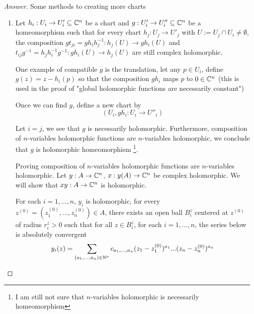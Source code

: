 \documentclass{article}
\begin{document}
\begin{proof}[Answer]
    Some methods to creating more charts
    \begin{enumerate}
        \item Let $h_i: U_i \to U'_i \subseteq \mathbb{C}^n$ be a chart and $g: U'_i \to U''_i \subseteq \mathbb{C}^n$ be a homeomorphism such that for every chart $h_j: U_j \to U'_j$ with $U := U_j \cap U_i \neq \emptyset$, the composition $g t_{ji} = g h_i h^{-1}_j: h_j(U) \to g h_i (U)$ and $t_{ij} g^{-1} = h_j h^{-1}_i g^{-1}: g h_i(U) \to h_j (U)$ are still complex holomorphic.
        \begin{center}
        \end{center}
        One example of compatible $g$ is the translation, let any $p \in U_i$, define $g(z) = z - h_i(p)$ so that the composition $g h_i$ maps $p$ to $0 \in \mathbb{C}^n$ (this is used in the proof of "global holomorphic functions are necessarily constant")

        Once we can find $g$, define a new chart by
        $$
            (U_i, g h_i: U_i \to U''_i)
        $$

        Let $i = j$, we see that $g$ is necessarily holomorphic. Furthermore, composition of $n$-variables holomorphic functions are $n$-variables holomorphic, we conclude that $g$ is holomorphic homeomorphism \footnote{I am still not sure that $n$-variables holomorphic is necessarily homeomorphism}.

        Proving composition of $n$-variables holomorphic functions are $n$-variables holomorphic. Let $y: A \to \mathbb{C}^n$, $x: y(A) \to \mathbb{C}^n$ be complex holomorphic. We will show that $xy: A \to \mathbb{C}^n$ is holomorphic.

        For each $i=1, ..., n$, $y_i$ is holomorphic, for every $z^{(0)} = (z^{(0)}_1, ..., z^{(0)}_n) \in A$, there exists an open ball $B^z_i$ centered at $z^{(0)}$ of radius $r^z_i > 0$ such that for all $z \in B^z_i$, for each $i=1, ..., n$, the series below is absolutely convergent
        $$
            y_i(z) = \sum_{(a_1,...,a_n) \in \mathbb{N}^n} c_{a_1,...,a_n} (z_1 - z^{(0)}_1)^{a_1} ... (z_n - z^{(0)}_n)^{a_n}
        $$


\end{enumerate}
\end{proof}
\end{document}
